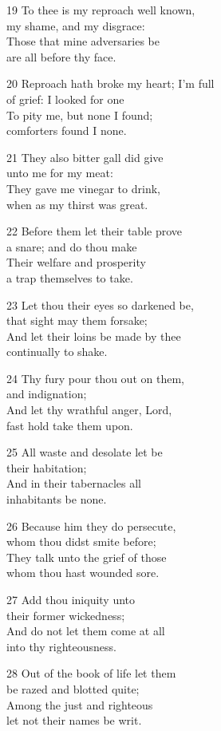 19 To thee is my reproach well known,\\
my shame, and my disgrace:\\
Those that mine adversaries be\\
are all before thy face.

20 Reproach hath broke my heart; I’m full\\
of grief: I looked for one\\
To pity me, but none I found;\\
comforters found I none.

21 They also bitter gall did give\\
unto me for my meat:\\
They gave me vinegar to drink,\\
when as my thirst was great.

22 Before them let their table prove\\
a snare; and do thou make\\
Their welfare and prosperity\\
a trap themselves to take.

23 Let thou their eyes so darkened be,\\
that sight may them forsake;\\
And let their loins be made by thee\\
continually to shake.

24 Thy fury pour thou out on them,\\
and indignation;\\
And let thy wrathful anger, Lord,\\
fast hold take them upon.

25 All waste and desolate let be\\
their habitation;\\
And in their tabernacles all\\
inhabitants be none.

26 Because him they do persecute,\\
whom thou didst smite before;\\
They talk unto the grief of those\\
whom thou hast wounded sore.

27 Add thou iniquity unto\\
their former wickedness;\\
And do not let them come at all\\
into thy righteousness.

28 Out of the book of life let them\\
be razed and blotted quite;\\
Among the just and righteous\\
let not their names be writ.

